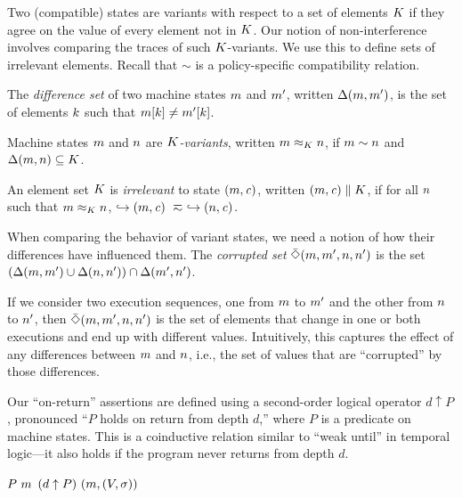 \documentclass[10pt,conference]{ieeetran}%
\theoremstyle{definition}
\begin{document}
Two (compatible) states are variants with respect to a set of elements \(K\)
if they agree on the value of every element not in \(K\).
Our notion of non-interference involves comparing the traces of such
\(K\)-variants. We use this to define sets of irrelevant elements.
Recall that \(\sim\) is a policy-specific compatibility relation.

 The \emph{difference set} of two machine states \(m\) and \(m'\),
written \(\Delta(m,m')\),
is the set of elements \(k\) such that \(m[k] \not = m'[k]\).

 Machine states \(m\) and \(n\) are {\em \(K\)-variants},
written \(m \approx_K n\), if \(m\sim n\) and
\(\Delta(m,n) \subseteq K\).

 An element set \(K\) is \emph{irrelevant} to state \((m,\mathit{c})\),
written \((m,\mathit{c}) \parallel K\), if for all
\(n\) such that \(m \approx_{K} n\),
\(\hookrightarrow (m,\mathit{c}) ~ \eqsim ~ \hookrightarrow (n,\mathit{c})\).


When comparing the behavior of variant states, we need a notion of how their
differences have influenced them.
 The {\em corrupted set} \(\bar{\Diamond}(m,m',n,n')\)
is the set \((\Delta(m,m') \cup \Delta(n,n')) \cap \Delta(m',n')\).

If we consider two execution sequences, one from \(m\) to \(m'\)
and the other from \(n\) to \(n'\),
then \(\bar{\Diamond}(m,m',n,n')\) is the set of elements that
change in one or both executions and end up with different values. Intuitively,
this captures the effect of any differences between \(m\) and \(n\), i.e.,
the set of values that are ``corrupted'' by those differences.

Our ``on-return'' assertions are defined using a second-order logical operator
\(d \uparrow P\), pronounced ``\(P\) holds on return from depth \(d\),''
where \(P\) is a predicate on machine states. This is a coinductive relation
similar to ``weak until'' in temporal logic---it also holds if the program never
returns from depth \(d\).

            {\(P ~ m\)}
            {\((d \uparrow P) ~ (m, (V,\sigma))\)}
\end{document}
